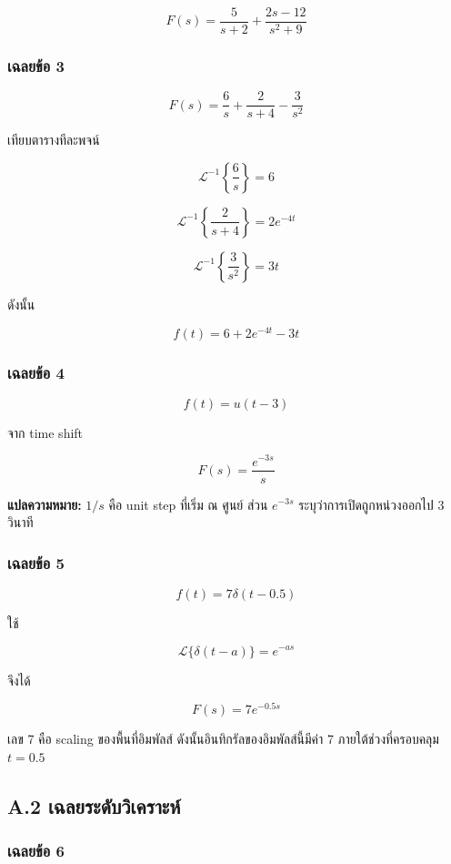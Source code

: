 \[
\boxed{F(s)=\frac{5}{s+2}+\frac{2s-12}{s^2+9}}
\]

\subsubsection{เฉลยข้อ 3}

\[
F(s)=\frac{6}{s}+\frac{2}{s+4}-\frac{3}{s^2}
\]

เทียบตารางทีละพจน์

\[
\mathcal{L}^{-1}\left\{\frac{6}{s}\right\}=6
\]

\[
\mathcal{L}^{-1}\left\{\frac{2}{s+4}\right\}=2e^{-4t}
\]

\[
\mathcal{L}^{-1}\left\{\frac{3}{s^2}\right\}=3t
\]

ดังนั้น

\[
\boxed{f(t)=6+2e^{-4t}-3t}
\]

\subsubsection{เฉลยข้อ 4}

\[
f(t)=u(t-3)
\]

จาก time shift

\[
\boxed{F(s)=\frac{e^{-3s}}{s}}
\]

\textbf{แปลความหมาย:} $1/s$ คือ unit step ที่เริ่ม ณ ศูนย์ ส่วน $e^{-3s}$ ระบุว่าการเปิดถูกหน่วงออกไป 3 วินาที

\subsubsection{เฉลยข้อ 5}

\[
f(t)=7\delta(t-0.5)
\]

ใช้

\[
\mathcal{L}\{\delta(t-a)\}=e^{-as}
\]

จึงได้

\[
\boxed{F(s)=7e^{-0.5s}}
\]

เลข 7 คือ scaling ของพื้นที่อิมพัลส์ ดังนั้นอินทิกรัลของอิมพัลส์นี้มีค่า 7 ภายใต้ช่วงที่ครอบคลุม $t=0.5$



\subsection{A.2 เฉลยระดับวิเคราะห์}

\subsubsection{เฉลยข้อ 6}

